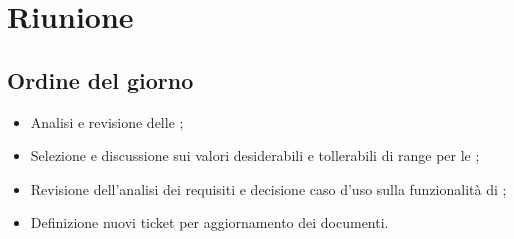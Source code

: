 \section{Riunione}
\subsection{Ordine del giorno}
\begin{itemize}
	\item Analisi e revisione delle ;
	\item Selezione e discussione sui valori desiderabili e tollerabili di range per le ;
	\item Revisione dell’analisi dei requisiti e decisione caso d’uso sulla funzionalità di ;
	\item Definizione nuovi ticket per aggiornamento dei documenti.
\end{itemize}

